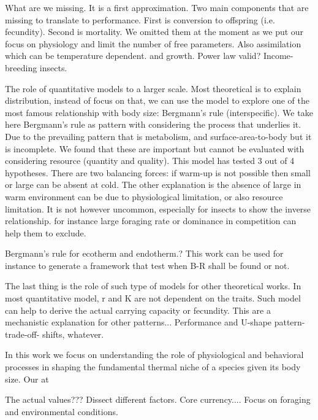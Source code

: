 What are we missing.
It is a first approximation. 
Two main components that are missing to translate to performance.
First is conversion to offspring (i.e. fecundity).
Second is mortality.
We omitted them at the moment as we put our focus on physiology and limit the number of free parameters.
Also assimilation which can be temperature dependent.
and growth.
Power law valid?
Income-breeding insects.

The role of quantitative models to a larger scale.
Most theoretical is to explain distribution, instead of focus on that, we can use the model to explore one of the most famous relationship with body size: Bergmann's rule (interspecific).
We take here Bergmann's rule as pattern with considering the process that underlies it.
Due to the prevailing pattern that is metabolism, and surface-area-to-body but it is incomplete.
We found that these are important but cannot be evaluated with considering resource (quantity and quality).
This model has tested 3 out of 4 hypotheses.
There are two balancing forces: if warm-up is not possible then small or large can be absent at cold.
The other explanation is the absence of large in warm environment can be due to physiological limitation, or also resource limitation.
It is not however uncommon, especially for insects to show the inverse relationship.
for instance large foraging rate or dominance in competition can help them to exclude.

 Bergmann's rule for ecotherm and endotherm.?
 This work can be used for instance to generate a framework that test when B-R shall be found or not.
 
 The last thing is the role of such type of models for other theoretical works.
 In most quantitative model, r and K are not dependent on the traits.
 Such model can help to derive the actual carrying capacity or fecundity.
 This are a mechanistic explanation for other patterns...
 Performance and U-shape pattern-trade-off- shifts, whatever.
  
In this work we focus on understanding the role of physiological and behavioral processes in shaping the fundamental thermal niche of a species given its body size.
Our at

The actual values???
Dissect different factors.
Core currency....
Focus on foraging and environmental conditions.



